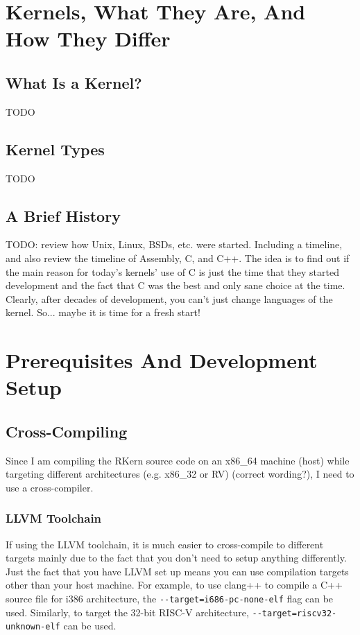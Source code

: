 \documentclass[a4paper,12pt,twoside]{report}
\begin{document}
    \chapter{Kernels, What They Are, And How They Differ}

	    \section{What Is a Kernel?}
	    	TODO

	    \section{Kernel Types}
	    	TODO

	    \section{A Brief History}
	        TODO: review how Unix, Linux, BSDs, etc. were started. Including a timeline, and also review the timeline of Assembly, C, and C++. The idea is to find out if the main reason for today's kernels' use of C is just the time that they started development and the fact that C was the best and only sane choice at the time. Clearly, after decades of development, you can't just change languages of the kernel. So... maybe it is time for a fresh start!

    \chapter{Prerequisites And Development Setup}

	    \section{Cross-Compiling}
	        Since I am compiling the RKern source code on an x86\_64 machine (host) while targeting different architectures (e.g. x86\_32 or RV) (correct wording?), I need to use a cross-compiler.

	        \subsection{LLVM Toolchain}
	        If using the LLVM toolchain, it is much easier to cross-compile to different targets mainly due to the fact that you don't need to setup anything differently. Just the fact that you have LLVM set up means you can use compilation targets other than your host machine.
	        For example, to use clang++ to compile a C++ source file for i386 architecture, the \verb|--target=i686-pc-none-elf| flag can be used. Similarly, to target the 32-bit RISC-V architecture, \verb|--target=riscv32-unknown-elf| can be used.
\end{document}
